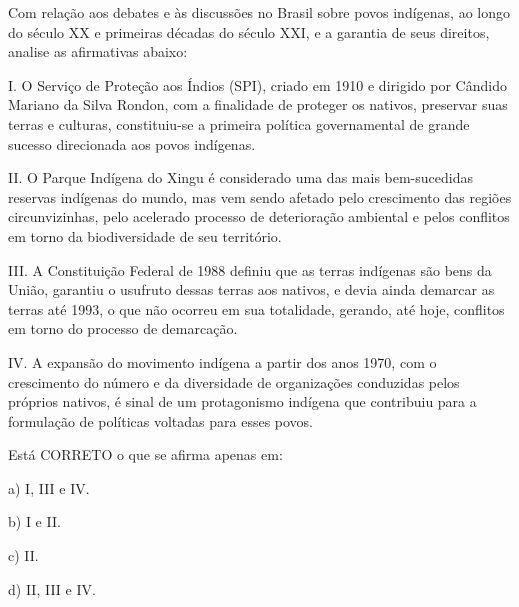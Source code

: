 \par

Com relação aos debates e às discussões no Brasil sobre povos indígenas, ao longo do século XX e primeiras décadas do século XXI, e a garantia de seus direitos, analise as afirmativas abaixo:

\par

I. O Serviço de Proteção aos Índios (SPI), criado em 1910 e dirigido por Cândido Mariano da Silva Rondon, com a finalidade de proteger os nativos, preservar suas terras e culturas, constituiu-se a primeira política governamental de grande sucesso direcionada aos povos indígenas.\par
II. O Parque Indígena do Xingu é considerado uma das mais bem-sucedidas reservas indígenas do mundo, mas vem sendo afetado pelo crescimento das regiões circunvizinhas, pelo acelerado processo de deterioração ambiental e pelos conflitos em torno da biodiversidade de seu território.\par
III. A Constituição Federal de 1988 definiu que as terras indígenas são bens da União, garantiu o usufruto dessas terras aos nativos, e devia ainda demarcar as terras até 1993, o que não ocorreu em sua totalidade, gerando, até hoje, conflitos em torno do processo de demarcação.\par
IV. A expansão do movimento indígena a partir dos anos 1970, com o crescimento do número e da diversidade de organizações conduzidas pelos próprios nativos, é sinal de um protagonismo indígena que contribuiu para a formulação de políticas voltadas para esses povos.

\par

Está CORRETO o que se afirma apenas em:

\par

a) I, III e IV.\par
b) I e II.\par
c) II.\par
d) II, III e IV.




